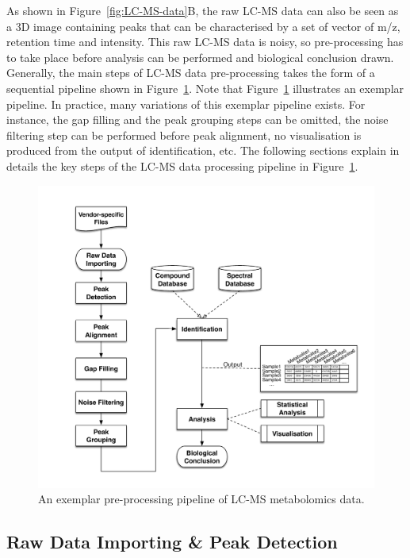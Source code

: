 As shown in Figure~\ref{fig:LC-MS-data}B, the raw LC-MS data can also be seen as a 3D image containing peaks that can be characterised by a set of vector of m/z, retention time and intensity. This raw LC-MS data is noisy, so pre-processing has to take place before analysis can be performed and biological conclusion drawn. Generally, the main steps of LC-MS data pre-processing takes the form of a sequential pipeline shown in Figure~\ref{fig:pipeline}. Note that Figure~\ref{fig:pipeline} illustrates an exemplar pipeline. In practice, many variations of this exemplar pipeline exists. For instance, the gap filling and the peak grouping steps can be omitted, the noise filtering step can be performed before peak alignment, no visualisation is produced from the output of identification, etc. The following sections explain in details the key steps of the LC-MS data processing pipeline in Figure~\ref{fig:pipeline}.

\begin{figure}
\noindent \centering{}\includegraphics[width=1\textwidth]{02-background/figures/pipeline.pdf}\caption{\label{fig:pipeline}An exemplar pre-processing pipeline of LC-MS metabolomics data.}
\end{figure}

\subsection{Raw Data Importing \& Peak Detection}

